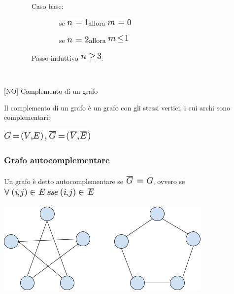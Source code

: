 \documentclass{article}
\begin{document}
{~~~~~~~~Caso base:}

{~~~~~~~~~~~~~~~~se }\includegraphics{images/image42.png}{allora
}\includegraphics{images/image399.png}

{~~~~~~~~~~~~~~~~se }\includegraphics{images/image400.png}{allora
}\includegraphics{images/image401.png}

{~~~~~~~~Passo induttivo }\includegraphics{images/image402.png}{:}

{~~~~~~~~~~~~~~~~}

{{[}NO{]} Complemento di un grafo}

{Il complemento di un grafo è un grafo con gli stessi vertici, i cui
archi sono complementari:}

\includegraphics{images/image403.png}

{}

\hypertarget{h.tsrwv4qy0dku}{\subsubsection{\texorpdfstring{{Grafo
autocomplementare}}{Grafo autocomplementare}}\label{h.tsrwv4qy0dku}}

{Un grafo è detto autocomplementare se
}\includegraphics{images/image404.png}{, ovvero se
}\includegraphics{images/image405.png}

{\includegraphics{images/image532.png}}
\end{document}
